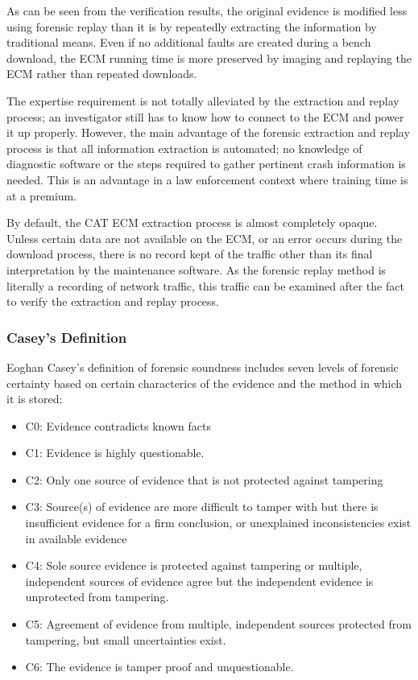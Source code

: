 As can be seen from the verification results, the original evidence is modified less using forensic replay than it is by repeatedly
extracting the information by traditional means. Even if no additional faults are created during a bench download, the ECM running
time is more preserved by imaging and replaying the ECM rather than repeated downloads.

The expertise requirement is not totally alleviated by the extraction and replay process; an investigator still has to know how to 
connect to the ECM and power it up properly. However, the main advantage of the forensic extraction and replay process is that
all information extraction is automated; no knowledge of diagnostic software or the steps required to gather pertinent crash information
is needed. This is an advantage in a law enforcement context where training time is at a premium.

By default, the CAT ECM extraction process is almost completely opaque. Unless certain data are not available on the ECM, or an error
occurs during the download process, there is no record kept of the traffic other than its final interpretation by the maintenance
software. As the forensic replay method is literally a recording of network traffic, this traffic can be examined after the fact
to verify the extraction and replay process.


\subsubsection{Casey's Definition}

Eoghan Casey's definition of forensic soundness includes seven levels of forensic certainty based on certain characterics
of the evidence and the method in which it is stored:

\begin{itemize}
\item C0: Evidence contradicts known facts
\item C1: Evidence is highly questionable.
\item C2: Only one source of evidence that is not protected against tampering
\item C3: Source(s) of evidence are more difficult to tamper with but there is insufficient evidence for a firm conclusion, or unexplained inconsistencies exist in available evidence
\item C4: Sole source evidence is protected against tampering or multiple, independent sources of evidence agree but the independent evidence is unprotected from tampering.
\item C5: Agreement of evidence from multiple, independent sources protected from tampering, but small uncertainties exist.
\item C6: The evidence is tamper proof and unquestionable.
\end{itemize}

